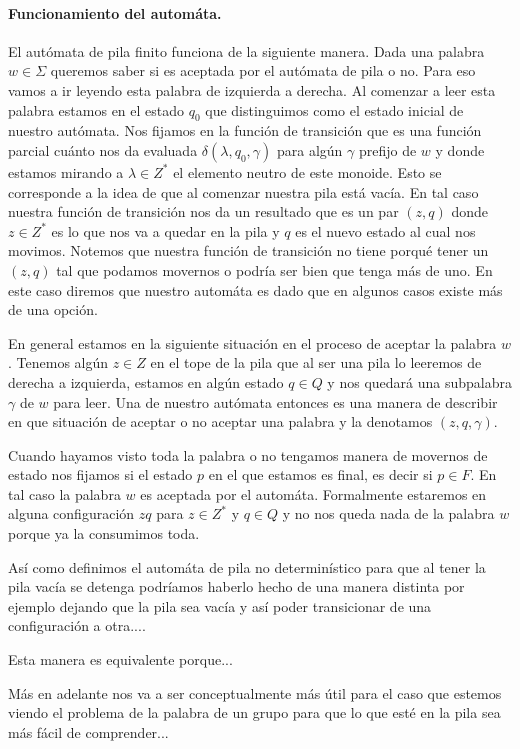 \documentclass[tesis.tex]{subfiles}
\newcommand{\APND}{automáta de pila no determinístico }
\begin{document}
\paragraph{Funcionamiento del automáta.}

El autómata de pila finito funciona de la siguiente manera. 
Dada una palabra $w \in \Sigma$ queremos saber si es aceptada por el autómata de pila o no. Para eso vamos a ir leyendo esta palabra de izquierda a derecha. 
Al comenzar a leer esta palabra estamos en el estado $q_0$ que distinguimos como el estado inicial de nuestro autómata. 
Nos fijamos en la función de transición que es una función parcial cuánto nos da evaluada  $\delta(\lambda,q_0,\gamma)$ para algún $\gamma$ prefijo de $w$ y donde estamos mirando a $\lambda \in Z^*$ el elemento neutro de este monoide. 
Esto se corresponde a la idea de que al comenzar nuestra pila está vacía. 
En tal caso nuestra función de transición nos da un resultado que es un par $(z,q)$ donde $z \in Z^{*}$ es lo que nos va a quedar en la pila y $q$ es el nuevo estado al cual nos movimos. 
Notemos que nuestra función de transición no tiene porqué tener un $(z,q)$ tal que podamos movernos o podría ser bien que tenga más de uno. 
En este caso diremos que nuestro automáta es  dado que en algunos casos existe más de una opción.

En general estamos en la siguiente situación en el proceso de aceptar la palabra $w$. 
Tenemos algún $z \in Z$ en el tope de la pila que al ser una pila lo leeremos de derecha a izquierda, estamos en algún estado $q \in Q$ y nos quedará una subpalabra $\gamma$ de $w$ para leer. Una  de nuestro autómata entonces es una manera de describir en que situación de aceptar o no aceptar una palabra y la denotamos $(z,q,\gamma)$. 

Cuando hayamos visto toda la palabra o no tengamos manera de movernos de estado nos fijamos si el estado $p$ en el que estamos es final, es decir si $p \in F$. 
En tal caso la palabra $w$ es aceptada por el automáta. Formalmente estaremos en alguna configuración $zq$ para $z \in Z^*$ y $q \in Q$ y no nos queda nada de la palabra $w$ porque ya la consumimos toda.
\medskip
\begin{obs}
	Así como definimos el \APND para que al tener la pila vacía se detenga podríamos haberlo hecho de una manera distinta por ejemplo dejando que la pila sea vacía y así poder transicionar de una configuración a otra....
	
	Esta manera es equivalente porque...
	
	Más en adelante nos va a ser conceptualmente más útil para el caso que estemos viendo el problema de la palabra de un grupo para que lo que esté en la pila sea más fácil de comprender...
\end{obs}
\end{document}
